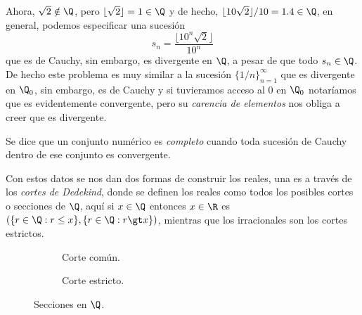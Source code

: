 \documentclass[11pt,oneside,a4paper]{book}
\begin{document}
Ahora, $\sqrt{2}\notin\Q$, pero $\lfloor\sqrt{2}\rfloor=1\in\Q$ y de hecho, $\lfloor 10\sqrt{2}\rfloor/10=1.4\in\Q$, en general, podemos especificar una sucesión
$$s_n=\frac{\lfloor 10^n\sqrt{2}\rfloor}{10^n}$$
que es de Cauchy, sin embargo, es divergente en $\Q$, a pesar de que todo $s_n\in\Q$. De hecho este problema es muy similar a la sucesión $\{1/n\}_{n=1}^\infty$ que es divergente en $\Q_0$, sin embargo, es de Cauchy y si tuvieramos acceso al $0$ en $\Q_0$ notaríamos que es evidentemente convergente, pero su \textit{carencia de elementos} nos obliga a creer que es divergente.
\begin{mydef}
Se dice que un conjunto numérico es \textit{completo} cuando toda sucesión de Cauchy dentro de ese conjunto es convergente.
\end{mydef}
Con estos datos se nos dan dos formas de construir los reales, una es a través de los \textit{cortes de Dedekind}, donde se definen los reales como todos los posibles cortes o secciones de $\Q$, aquí si $x\in\Q$ entonces $x\in\R$ es $(\{r\in\Q:r\leq x\},\{r\in\Q:r\gt x\})$, mientras que los irracionales son los cortes estrictos.
\begin{figure}
\centering
\begin{subfigure}{\textwidth}
\centering
{}
\caption{Corte común.}
\end{subfigure}
\begin{subfigure}{\textwidth}
\centering
{}
\caption{Corte estricto.}
\end{subfigure}
\caption{Secciones en $\Q$.}
\label{fig:dedekind-cut}
\end{figure}
\end{document}
